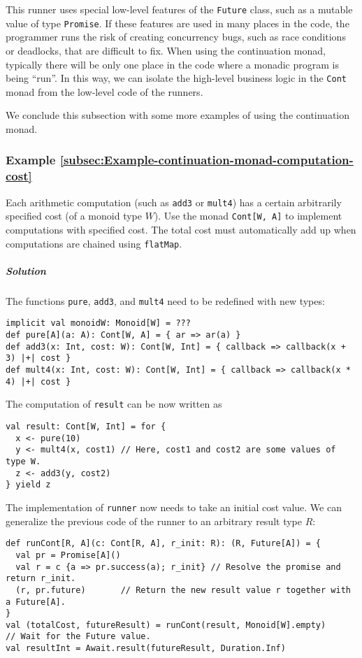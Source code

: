 \noindent This runner uses special low-level features of the \lstinline!Future!
class, such as a mutable value of type \lstinline!Promise!. If these
features are used in many places in the code, the programmer runs
the risk of creating concurrency bugs, such as race conditions or
deadlocks, that are difficult to fix. When using the continuation
monad, typically there will be only one place in the code where a
monadic program is being \textsf{``}run\textsf{''}. In this way, we can isolate the
high-level business logic in the \lstinline!Cont! monad from the
low-level code of the runners.

We conclude this subsection with some more examples of using the continuation
monad.

\subsubsection{Example \label{subsec:Example-continuation-monad-computation-cost}\ref{subsec:Example-continuation-monad-computation-cost}}

Each arithmetic computation (such as \lstinline!add3! or \lstinline!mult4!)
has a certain arbitrarily specified cost (of a monoid type $W$).
Use the monad \lstinline!Cont[W, A]! to implement computations with
specified cost. The total cost must automatically add up when computations
are chained using \lstinline!flatMap!.

\subparagraph{Solution}

The functions \lstinline!pure!, \lstinline!add3!, and \lstinline!mult4!
need to be redefined with new types:
\begin{lstlisting}
implicit val monoidW: Monoid[W] = ???
def pure[A](a: A): Cont[W, A] = { ar => ar(a) }
def add3(x: Int, cost: W): Cont[W, Int] = { callback => callback(x + 3) |+| cost }
def mult4(x: Int, cost: W): Cont[W, Int] = { callback => callback(x * 4) |+| cost }
\end{lstlisting}
The computation of \lstinline!result! can be now written as
\begin{lstlisting}
val result: Cont[W, Int] = for {
  x <- pure(10)
  y <- mult4(x, cost1) // Here, cost1 and cost2 are some values of type W.
  z <- add3(y, cost2)
} yield z
\end{lstlisting}
The implementation of \lstinline!runner! now needs to take an initial
cost value. We can generalize the previous code of the runner to an
arbitrary result type $R$:
\begin{lstlisting}
def runCont[R, A](c: Cont[R, A], r_init: R): (R, Future[A]) = {
  val pr = Promise[A]()
  val r = c {a => pr.success(a); r_init} // Resolve the promise and return r_init.
  (r, pr.future)       // Return the new result value r together with a Future[A].
}
val (totalCost, futureResult) = runCont(result, Monoid[W].empty)
// Wait for the Future value.
val resultInt = Await.result(futureResult, Duration.Inf)
\end{lstlisting}

